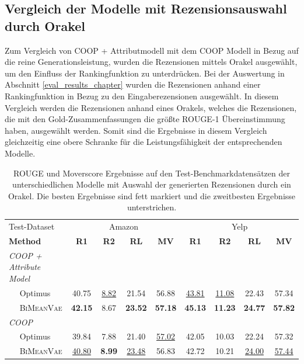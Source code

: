 \subsection{Vergleich der Modelle mit Rezensionsauswahl durch Orakel}
\label{oracle}
Zum Vergleich von COOP + Attributmodell mit dem COOP Modell in Bezug auf die reine Generationsleistung, wurden die Rezensionen mittels Orakel ausgewählt, um den Einfluss der Rankingfunktion zu unterdrücken.
Bei der Auswertung in Abschnitt \ref{eval_results_chapter} wurden die Rezensionen anhand einer Rankingfunktion in Bezug zu den Eingaberezensionen ausgewählt.
In diesem Vergleich werden die Rezensionen anhand eines Orakels, welches die Rezensionen, die mit den Gold-Zusammenfassungen die größte ROUGE-1 Übereinstimmung haben, ausgewählt werden.
Somit sind die Ergebnisse in diesem Vergleich gleichzeitig eine obere Schranke für die Leistungsfähigkeit der entsprechenden Modelle.


\begin{table}[!h]
    \centering
    \begin{tabular}{@{}lcccc|cccc@{}}
    \toprule
             Test-Dataset                  & \multicolumn{4}{c}{Amazon} & \multicolumn{4}{c}{Yelp} \\ 
    \textbf{Method} & \textbf{R1} & \textbf{R2} & \textbf{RL} & \textbf{MV} & \textbf{R1} & \textbf{R2} & \textbf{RL} & \textbf{MV}\\ \midrule
      
    \textit{COOP + Attribute Model}        &         &         &        &        &        &   & &     \\
    $\quad$ Optimus                         & 40.75 & \underline{8.82} & 21.54 & 56.88 & \underline{43.81} & \underline{11.08} & 22.43 & 57.34 \\ 
    $\quad$ \textsc{BiMeanVae}              & \textbf{42.15} & 8.67 & \textbf{23.52} & \textbf{57.18} & \textbf{45.13} & \textbf{11.23} & \textbf{24.77} & \textbf{57.82} \\ \midrule
    
    \textit{COOP}                           &       &      &       &       &       &       &       &        \\ %
    $\quad$ Optimus                          & 39.84 & 7.88 & 21.40 & \underline{57.02} & 42.05 & 10.03 & 22.24 & 57.32\\ 
    $\quad$ \textsc{BiMeanVae}               & \underline{40.80} & \textbf{8.99} & \underline{23.48} & 56.83 & 42.72 & 10.21 & \underline{24.00} & \underline{57.44} \\ \bottomrule
    \end{tabular}
    \caption{ROUGE und Moverscore Ergebnisse auf den Test-Benchmarkdatensätzen der unterschiedlichen Modelle mit Auswahl der generierten Rezensionen durch ein Orakel. Die besten Ergebnisse sind fett markiert und die zweitbesten Ergebnisse unterstrichen.}
    \label{oracle_results}
\end{table}

